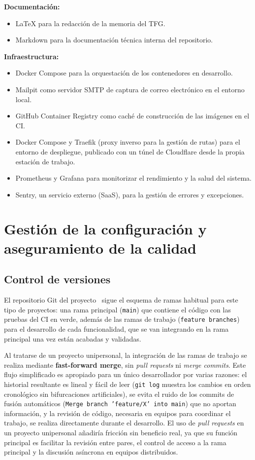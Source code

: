 \textbf{Documentación:}
\begin{itemize}[noitemsep]
 \item \LaTeX{} para la redacción de la memoria del TFG.
 \item Markdown para la documentación técnica interna del repositorio.
\end{itemize}

\textbf{Infraestructura:}
\begin{itemize}[noitemsep]
 \item Docker Compose para la orquestación de los contenedores en desarrollo.
 \item Mailpit como servidor SMTP de captura de correo electrónico en el entorno local.
 \item GitHub Container Registry como caché de construcción de las imágenes en el CI.
 \item Docker Compose y Traefik (proxy inverso para la gestión de rutas) para el entorno de despliegue, publicado con un túnel de Cloudflare desde la propia estación de trabajo.
 \item Prometheus y Grafana para monitorizar el rendimiento y la salud del sistema.
 \item Sentry, un servicio externo (SaaS), para la gestión de errores y excepciones.
\end{itemize}

\section{Gestión de la configuración y aseguramiento de la calidad}

\subsection{Control de versiones}

El repositorio Git del proyecto~\cite{cie10repo2026} sigue el esquema de ramas habitual para este tipo de proyectos: una rama principal (\texttt{main}) que contiene el código con las pruebas del CI en verde, además de las ramas de trabajo (\texttt{feature branches}) para el desarrollo de cada funcionalidad, que se van integrando en la rama principal una vez están acabadas y validadas.

Al tratarse de un proyecto unipersonal, la integración de las ramas de trabajo se realiza mediante \textbf{fast-forward merge}, sin \emph{pull requests} ni \emph{merge commits}. Este flujo simplificado es apropiado para un único desarrollador por varias razones: el historial resultante es lineal y fácil de leer (\texttt{git log} muestra los cambios en orden cronológico sin bifurcaciones artificiales), se evita el ruido de los commits de fusión automáticos (\texttt{Merge branch 'feature/X' into main}) que no aportan información, y la revisión de código, necesaria en equipos para coordinar el trabajo, se realiza directamente durante el desarrollo. El uso de \emph{pull requests} en un proyecto unipersonal añadiría fricción sin beneficio real, ya que su función principal es facilitar la revisión entre pares, el control de acceso a la rama principal y la discusión asíncrona en equipos distribuidos.

